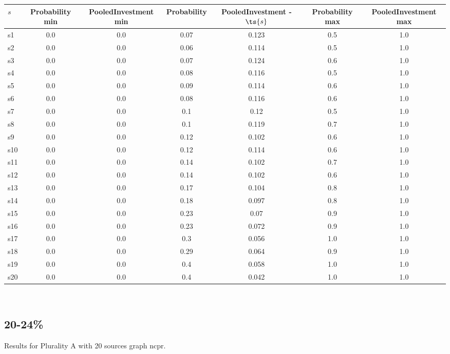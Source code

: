 \documentclass{article}
\begin{document}
\noindent\begin{tabular}{|l|c|c|c|c|c|c|}
\hline
$s$& Probability min & PooledInvestment min & Probability & PooledInvestment - $\ts{s}$ & Probability max & PooledInvestment max\\
\hline
s1 &0.0 & 0.0 & 0.07 & 0.123 & 0.5 & 1.0\\
\hline
s2 &0.0 & 0.0 & 0.06 & 0.114 & 0.5 & 1.0\\
\hline
s3 &0.0 & 0.0 & 0.07 & 0.124 & 0.6 & 1.0\\
\hline
s4 &0.0 & 0.0 & 0.08 & 0.116 & 0.5 & 1.0\\
\hline
s5 &0.0 & 0.0 & 0.09 & 0.114 & 0.6 & 1.0\\
\hline
s6 &0.0 & 0.0 & 0.08 & 0.116 & 0.6 & 1.0\\
\hline
s7 &0.0 & 0.0 & 0.1 & 0.12 & 0.5 & 1.0\\
\hline
s8 &0.0 & 0.0 & 0.1 & 0.119 & 0.7 & 1.0\\
\hline
s9 &0.0 & 0.0 & 0.12 & 0.102 & 0.6 & 1.0\\
\hline
s10 &0.0 & 0.0 & 0.12 & 0.114 & 0.6 & 1.0\\
\hline
s11 &0.0 & 0.0 & 0.14 & 0.102 & 0.7 & 1.0\\
\hline
s12 &0.0 & 0.0 & 0.14 & 0.102 & 0.6 & 1.0\\
\hline
s13 &0.0 & 0.0 & 0.17 & 0.104 & 0.8 & 1.0\\
\hline
s14 &0.0 & 0.0 & 0.18 & 0.097 & 0.8 & 1.0\\
\hline
s15 &0.0 & 0.0 & 0.23 & 0.07 & 0.9 & 1.0\\
\hline
s16 &0.0 & 0.0 & 0.23 & 0.072 & 0.9 & 1.0\\
\hline
s17 &0.0 & 0.0 & 0.3 & 0.056 & 1.0 & 1.0\\
\hline
s18 &0.0 & 0.0 & 0.29 & 0.064 & 0.9 & 1.0\\
\hline
s19 &0.0 & 0.0 & 0.4 & 0.058 & 1.0 & 1.0\\
\hline
s20 &0.0 & 0.0 & 0.4 & 0.042 & 1.0 & 1.0\\
\hline
\end{tabular}\\

\newpage

\subsection{20-24\%}

\noindent Results for Plurality A with 20 sources graph ncpr.
\end{document}
